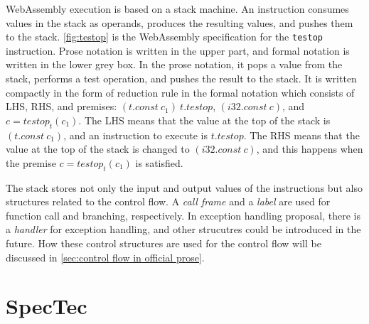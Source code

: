 WebAssembly execution is based on a stack machine.
An instruction consumes values in the stack as operands, produces the
resulting values, and pushes them to the stack.
\cref{fig:testop} is the WebAssembly specification for the \texttt{testop}
instruction.
Prose notation is written in the upper part, and formal notation is written in
the lower grey box.
In the prose notation, it pops a value from the stack, performs a test
operation, and pushes the result to the stack.
It is written compactly in the form of reduction rule in the formal notation
which consists of LHS, RHS, and premises: $(t.const ~ c_1) ~ t.testop$,
$(i32.const ~ c)$, and $c = testop_t(c_1)$.
The LHS means that the value at the top of the stack is $(t.const ~ c_1)$,
and an instruction to execute is $t.testop$.
The RHS means that the value at the top of the stack is changed to $(i32.const
~ c)$, and this happens when the premise $c = testop_t(c_1)$ is satisfied.

The stack stores not only the input and output values of the instructions but also
structures related to the control flow.
A \textit{call frame} and a \textit{label} are used for function call and
branching, respectively.
In exception handling proposal, there is a \textit{handler} for exception
handling, and other strucutres could be introduced in the future.
How these control structures are used for the control flow will be discussed in
\cref{sec:control flow in official prose}. \\

\section{SpecTec}
